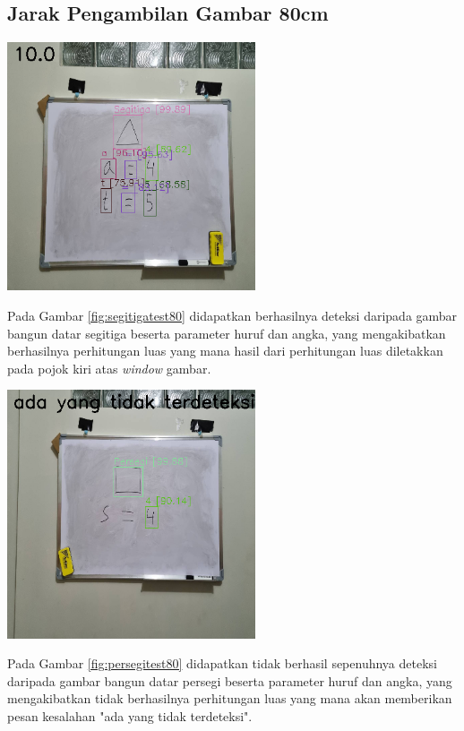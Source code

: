 \subsection{Jarak Pengambilan Gambar 80cm}
\begin{center}
	\includegraphics[width=0.55\textwidth]{gambar/seg80hasil.png}
	\label{fig:segitigatest80}
\end{center}
Pada Gambar \ref{fig:segitigatest80} didapatkan berhasilnya deteksi daripada gambar bangun datar segitiga beserta parameter huruf dan angka, yang mengakibatkan berhasilnya perhitungan luas yang mana hasil dari perhitungan luas diletakkan pada pojok kiri atas \textit{window} gambar.

\begin{center}
	\includegraphics[width=0.55\textwidth]{gambar/pers80hasil.png}
	\label{fig:persegitest80}
\end{center}
Pada Gambar \ref{fig:persegitest80} didapatkan tidak berhasil sepenuhnya deteksi daripada gambar bangun datar persegi beserta parameter huruf dan angka, yang mengakibatkan tidak berhasilnya perhitungan luas yang mana akan memberikan pesan kesalahan "ada yang tidak terdeteksi".

